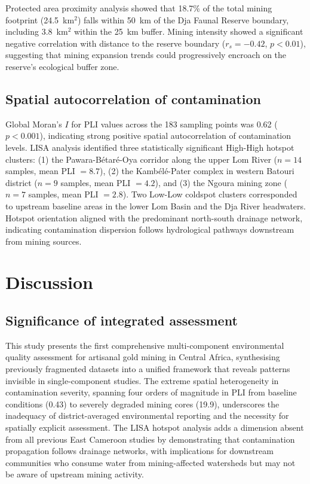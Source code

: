\documentclass[preprint,12pt,authoryear]{elsarticle}
\begin{document}
Protected area proximity analysis showed that 18.7\% of the total mining footprint (24.5~km$^{2}$) falls within 50~km of the Dja Faunal Reserve boundary, including 3.8~km$^{2}$ within the 25~km buffer. Mining intensity showed a significant negative correlation with distance to the reserve boundary ($r_s = -0.42$, $p < 0.01$), suggesting that mining expansion trends could progressively encroach on the reserve's ecological buffer zone.


\subsection{Spatial autocorrelation of contamination}

Global Moran's $I$ for PLI values across the 183 sampling points was 0.62 ($p < 0.001$), indicating strong positive spatial autocorrelation of contamination levels. LISA analysis identified three statistically significant High-High hotspot clusters: (1) the Pawara-B\'{e}tar\'{e}-Oya corridor along the upper Lom River ($n = 14$ samples, mean PLI $= 8.7$), (2) the Kamb\'{e}l\'{e}-Pater complex in western Batouri district ($n = 9$ samples, mean PLI $= 4.2$), and (3) the Ngoura mining zone ($n = 7$ samples, mean PLI $= 2.8$). Two Low-Low coldspot clusters corresponded to upstream baseline areas in the lower Lom Basin and the Dja River headwaters. Hotspot orientation aligned with the predominant north-south drainage network, indicating contamination dispersion follows hydrological pathways downstream from mining sources.


\section{Discussion}

\subsection{Significance of integrated assessment}

This study presents the first comprehensive multi-component environmental quality assessment for artisanal gold mining in Central Africa, synthesising previously fragmented datasets into a unified framework that reveals patterns invisible in single-component studies. The extreme spatial heterogeneity in contamination severity, spanning four orders of magnitude in PLI from baseline conditions (0.43) to severely degraded mining cores (19.9), underscores the inadequacy of district-averaged environmental reporting and the necessity for spatially explicit assessment. The LISA hotspot analysis adds a dimension absent from all previous East Cameroon studies by demonstrating that contamination propagation follows drainage networks, with implications for downstream communities who consume water from mining-affected watersheds but may not be aware of upstream mining activity.
\end{document}
